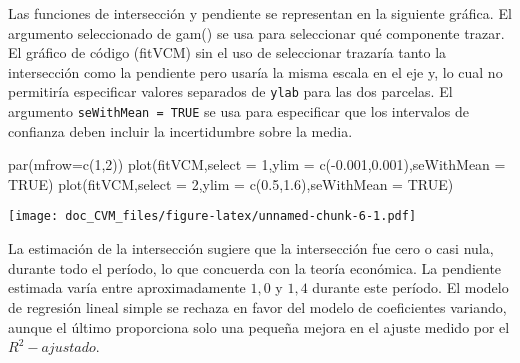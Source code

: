 \documentclass[
]{article}
\newenvironment{Shaded}{\begin{snugshade}}{\end{snugshade}}
\newcommand{\AttributeTok}[1]{\textcolor[rgb]{0.77,0.63,0.00}{#1}}
\newcommand{\ConstantTok}[1]{\textcolor[rgb]{0.00,0.00,0.00}{#1}}
\newcommand{\DecValTok}[1]{\textcolor[rgb]{0.00,0.00,0.81}{#1}}
\newcommand{\FloatTok}[1]{\textcolor[rgb]{0.00,0.00,0.81}{#1}}
\newcommand{\FunctionTok}[1]{\textcolor[rgb]{0.00,0.00,0.00}{#1}}
\newcommand{\NormalTok}[1]{#1}
\newcommand{\SpecialCharTok}[1]{\textcolor[rgb]{0.00,0.00,0.00}{#1}}
\begin{document}
Las funciones de intersección y pendiente se representan en la siguiente
gráfica. El argumento seleccionado de gam() se usa para seleccionar qué
componente trazar. El gráfico de código (fitVCM) sin el uso de
seleccionar trazaría tanto la intersección como la pendiente pero usaría
la misma escala en el eje y, lo cual no permitiría especificar valores
separados de \texttt{ylab} para las dos parcelas. El argumento
\texttt{seWithMean\ =\ TRUE} se usa para especificar que los intervalos
de confianza deben incluir la incertidumbre sobre la media.

\begin{Shaded}
\begin{Highlighting}[]
\FunctionTok{par}\NormalTok{(}\AttributeTok{mfrow=}\FunctionTok{c}\NormalTok{(}\DecValTok{1}\NormalTok{,}\DecValTok{2}\NormalTok{))}
\FunctionTok{plot}\NormalTok{(fitVCM,}\AttributeTok{select =} \DecValTok{1}\NormalTok{,}\AttributeTok{ylim =} \FunctionTok{c}\NormalTok{(}\SpecialCharTok{{-}}\FloatTok{0.001}\NormalTok{,}\FloatTok{0.001}\NormalTok{),}\AttributeTok{seWithMean =} \ConstantTok{TRUE}\NormalTok{)}
\FunctionTok{plot}\NormalTok{(fitVCM,}\AttributeTok{select =} \DecValTok{2}\NormalTok{,}\AttributeTok{ylim =} \FunctionTok{c}\NormalTok{(}\FloatTok{0.5}\NormalTok{,}\FloatTok{1.6}\NormalTok{),}\AttributeTok{seWithMean =} \ConstantTok{TRUE}\NormalTok{)}
\end{Highlighting}
\end{Shaded}

\texttt{[image: doc\_CVM\_files/figure-latex/unnamed-chunk-6-1.pdf]}

La estimación de la intersección sugiere que la intersección fue cero o
casi nula, durante todo el período, lo que concuerda con la teoría
económica. La pendiente estimada varía entre aproximadamente \(1,0\) y
\(1,4\) durante este período. El modelo de regresión lineal simple se
rechaza en favor del modelo de coeficientes variando, aunque el último
proporciona solo una pequeña mejora en el ajuste medido por el
\(R^2-ajustado\).
\end{document}
